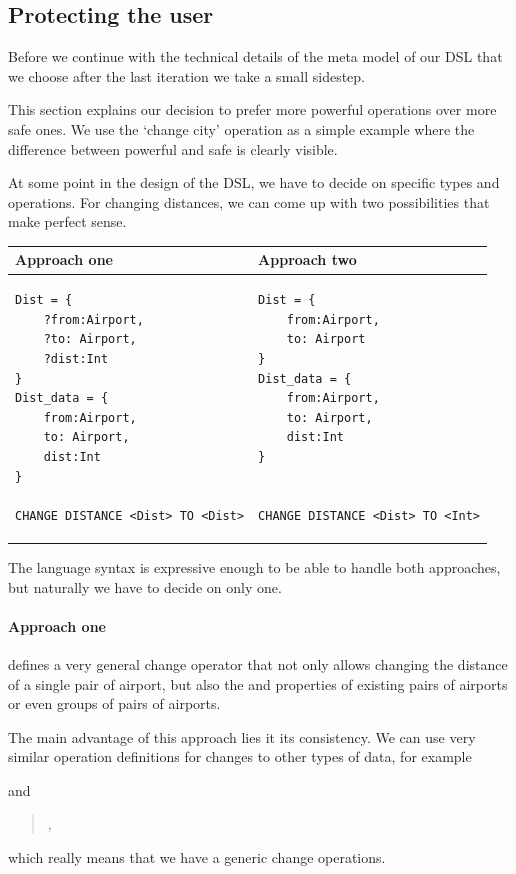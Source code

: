 \subsection{Protecting the user}
\label{sec:protecting}
Before we continue with the technical details of the meta model of our DSL
that we choose after the last iteration we take a small sidestep.

This section explains our decision to prefer more powerful operations over more
safe ones. We use the ‘change city’ operation as a simple example where the
difference between powerful and safe is clearly visible.

At some point in the design of the DSL, we have to decide on specific types and
operations. For changing distances, we can come up with two possibilities that
make perfect sense.

\begin{center}
\begin{tabular}{p{}p{}}
  Approach one & Approach two \\\hline
  \begin{lstlisting}
Dist = {
    ?from:Airport,
    ?to: Airport,
    ?dist:Int
}
Dist_data = {
    from:Airport,
    to: Airport,
    dist:Int
}

CHANGE DISTANCE <Dist> TO <Dist>
  \end{lstlisting} &
  \begin{lstlisting}
Dist = {
    from:Airport,
    to: Airport
}
Dist_data = {
    from:Airport,
    to: Airport,
    dist:Int
}


CHANGE DISTANCE <Dist> TO <Int>
  \end{lstlisting}
\end{tabular}
\end{center}
The language syntax is expressive enough to be able to handle both approaches,
but naturally we have to decide on only one.

\paragraph{Approach one}
defines a very general change operator that not only allows
changing the distance of a single pair of airport, but also the  and
 properties of existing pairs of airports or even groups of pairs of
airports.

The main advantage of this approach lies it its consistency.  We can use very
similar operation definitions for changes to other types of data, for example
\begin{quote}
\end{quote}
and
\begin{quote}
  ,
\end{quote}
which really means that we have a generic change operations.

